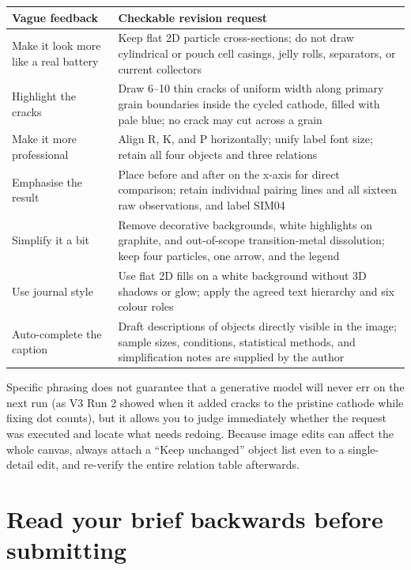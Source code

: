 \begin{center}\small
\begin{tabularx}{\linewidth}{YY}
\toprule
\textbf{Vague feedback} & \textbf{Checkable revision request} \\
\midrule
Make it look more like a real battery & Keep flat 2D particle cross-sections; do not draw cylindrical or pouch cell casings, jelly rolls, separators, or current collectors \\
Highlight the cracks & Draw 6--10 thin cracks of uniform width along primary grain boundaries inside the cycled cathode, filled with pale blue; no crack may cut across a grain \\
Make it more professional & Align R, K, and P horizontally; unify label font size; retain all four objects and three relations \\
Emphasise the result & Place before and after on the x-axis for direct comparison; retain individual pairing lines and all sixteen raw observations, and label SIM04 \\
Simplify it a bit & Remove decorative backgrounds, white highlights on graphite, and out-of-scope transition-metal dissolution; keep four particles, one arrow, and the legend \\
Use journal style & Use flat 2D fills on a white background without 3D shadows or glow; apply the agreed text hierarchy and six colour roles \\
Auto-complete the caption & Draft descriptions of objects directly visible in the image; sample sizes, conditions, statistical methods, and simplification notes are supplied by the author \\
\bottomrule
\end{tabularx}
\end{center}

Specific phrasing does not guarantee that a generative model will never err on the next run (as V3 Run 2 showed when it added cracks to the pristine cathode while fixing dot counts), but it allows you to judge immediately whether the request was executed and locate what needs redoing. Because image edits can affect the whole canvas, always attach a ``Keep unchanged'' object list even to a single-detail edit, and re-verify the entire relation table afterwards.

\section{Read your brief backwards before submitting}


